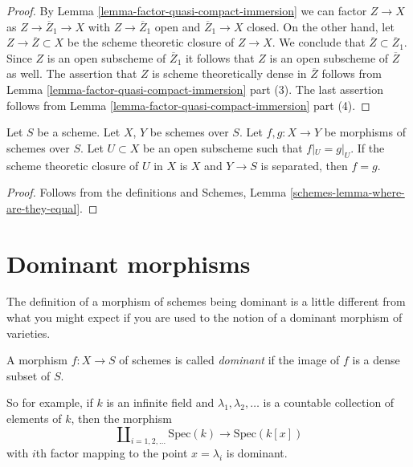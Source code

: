 \begin{proof}
By Lemma \ref{lemma-factor-quasi-compact-immersion} we can factor
$Z \to X$ as $Z \to \overline{Z}_1 \to X$ with $Z \to \overline{Z}_1$
open and $\overline{Z}_1 \to X$ closed. On the other hand, let
$Z \to \overline{Z} \subset X$ be the scheme theoretic closure of
$Z \to X$. We conclude that $\overline{Z} \subset \overline{Z}_1$.
Since $Z$ is an open subscheme of $\overline{Z}_1$ it follows
that $Z$ is an open subscheme of $\overline{Z}$ as well.
The assertion that $Z$ is scheme theoretically dense in
$\overline{Z}$ follows from
Lemma \ref{lemma-factor-quasi-compact-immersion} part (3).
The last assertion follows from
Lemma \ref{lemma-factor-quasi-compact-immersion} part (4).
\end{proof}

\begin{lemma}
\label{lemma-equality-of-morphisms}
Let $S$ be a scheme. Let $X$, $Y$ be schemes over $S$.
Let $f, g : X \to Y$ be morphisms of schemes over $S$.
Let $U \subset X$ be an open subscheme such that
$f|_U = g|_U$. If the scheme theoretic closure of $U$
in $X$ is $X$ and $Y \to S$ is separated, then $f = g$.
\end{lemma}

\begin{proof}
Follows from the definitions and
Schemes, Lemma \ref{schemes-lemma-where-are-they-equal}.
\end{proof}




\section{Dominant morphisms}
\label{section-dominant}

\noindent
The definition of a morphism of schemes being dominant is a little
different from what you might expect if you are used to the notion
of a dominant morphism of varieties.

\begin{definition}
\label{definition-dominant}
A morphism $f : X \to S$ of schemes is called {\it dominant} if the
image of $f$ is a dense subset of $S$.
\end{definition}

\noindent
So for example, if $k$ is an infinite field and $\lambda_1, \lambda_2, \ldots$
is a countable collection of elements of $k$, then the morphism
$$
\coprod\nolimits_{i = 1, 2, \ldots } \text{Spec}(k)
\longrightarrow
\text{Spec}(k[x])
$$
with $i$th factor mapping to the point $x = \lambda_i$ is dominant.

